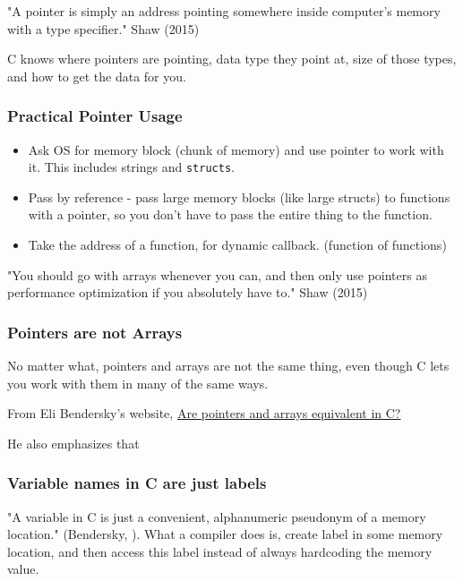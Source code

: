 \documentclass[10pt]{amsart}
\begin{document}
"A pointer is simply an address pointing somewhere inside computer's memory with a type specifier."  Shaw (2015) \cite{Shaw2015}


C knows where pointers are pointing, data type they point at, size of those types, and how to get the data for you.  

\subsubsection{Practical Pointer Usage}
\begin{itemize}
	\item Ask OS for memory block (chunk of memory) and use pointer to work with it.  This includes strings and \verb|structs|.  
	\item Pass by reference - pass large memory blocks (like large structs) to functions with a pointer, so you don't have to pass the entire thing to the function.  
	\item Take the address of a function, for dynamic callback. (function of functions)
\end{itemize}

"You should go with arrays whenever you can, and then only use pointers as performance optimization if you absolutely have to."  Shaw (2015) \cite{Shaw2015}

\subsubsection{Pointers are not Arrays}  

No matter what, pointers and arrays are not the same thing, even though C lets you work with them in many of the same ways.  

From Eli Bendersky's website, \href{https://eli.thegreenplace.net/2009/10/21/are-pointers-and-arrays-equivalent-in-c}{Are pointers and arrays equivalent in C?}

He also emphasizes that 

\subsubsection{Variable names in C are just labels}  

"A variable in C is just a convenient, alphanumeric pseudonym of a memory location." (Bendersky, \cite{Bend}).  What a compiler does is, create label in some memory location, and then access this label instead of always hardcoding the memory value.   
\end{document}
